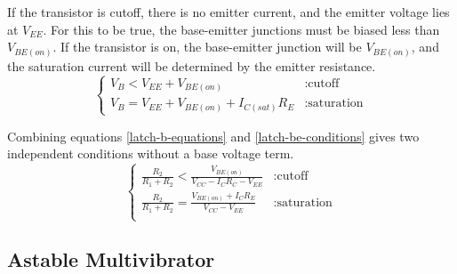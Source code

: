 \documentclass[titlepage, letterpaper, 10.5pt]{article}
\begin{document}
If the transistor is cutoff, there is no emitter current, and the emitter voltage lies at $V_{EE}$.
For this to be true, the base-emitter junctions must be biased less than $V_{BE(on)}$.
If the transistor is on, the base-emitter junction will be $V_{BE(on)}$, and the saturation
current will be determined by the emitter resistance.
\begin{equation}
\left\{
	\begin{array}{lr}
	V_{B}<V_{EE}+V_{BE(on)}	& : \textrm{cutoff}	\\
	V_{B}=V_{EE}+V_{BE(on)}+I_{C(sat)}R_{E}	& : \textrm{saturation}
	\end{array}
\right.
\label{latch-be-conditions}
\end{equation}

Combining equations \ref{latch-b-equations} and \ref{latch-be-conditions} gives two independent
conditions without a base voltage term.
\begin{equation*}
\left\{
	\begin{array}{lr}
	\frac{R_{2}}{R_{1}+R_{2}}<\frac{V_{BE(on)}}{V_{CC}-I_{C}R_{C}-V_{EE}}	& : \textrm{cutoff}	\\
	\frac{R_{2}}{R_{1}+R_{2}}=\frac{V_{BE(on)}+I_{C}R_{E}}{V_{CC}-V_{EE}}	& : \textrm{saturation}	\\
	\end{array}
\right.
\end{equation*}

\subsection{Astable Multivibrator}
\end{document}
